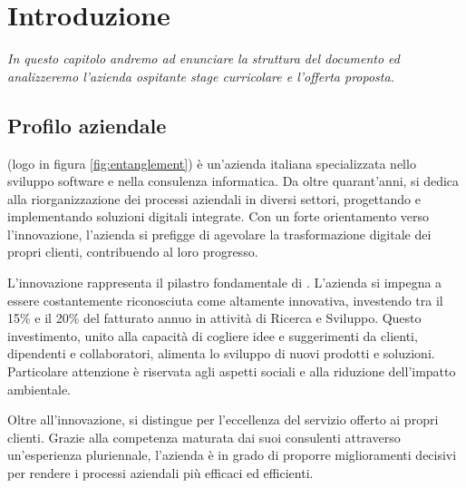 \chapter{Introduzione}
\label{cap:introduzione}
%
%
%
%
%
%
%
\emph{In questo capitolo andremo ad enunciare la struttura del documento ed analizzeremo l'azienda ospitante stage curricolare e l'offerta proposta.}



\section{Profilo aziendale}
\myCompany (logo in figura \ref{fig:entanglement}) è un'azienda italiana specializzata nello sviluppo software e nella consulenza informatica. Da oltre quarant'anni, \myCompany si dedica alla riorganizzazione dei processi aziendali in diversi settori, progettando e implementando soluzioni digitali integrate. Con un forte orientamento verso l'innovazione, l'azienda si prefigge di agevolare la trasformazione digitale dei propri clienti, contribuendo al loro progresso.

L'innovazione rappresenta il pilastro fondamentale di \myCompany. L'azienda si impegna a essere costantemente riconosciuta come altamente innovativa, investendo tra il 15\% e il 20\% del fatturato annuo in attività di Ricerca e Sviluppo. Questo investimento, unito alla capacità di cogliere idee e suggerimenti da clienti, dipendenti e collaboratori, alimenta lo sviluppo di nuovi prodotti e soluzioni. Particolare attenzione è riservata agli aspetti sociali e alla riduzione dell'impatto ambientale.

Oltre all'innovazione, \myCompany si distingue per l'eccellenza del servizio offerto ai propri clienti. Grazie alla competenza maturata dai suoi consulenti attraverso un'esperienza pluriennale, l'azienda è in grado di proporre miglioramenti decisivi per rendere i processi aziendali più efficaci ed efficienti.


